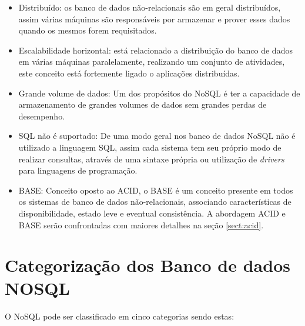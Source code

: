 \documentclass[12pt]{article}
\begin{document}
\begin{itemize}
	\item Distribuído: os banco de dados não-relacionais são em geral distribuídos, assim várias máquinas são responsáveis por armazenar e prover esses dados quando os mesmos forem requisitados.\\
	\item Escalabilidade horizontal: está relacionado a distribuição do banco de dados em várias máquinas paralelamente, realizando um conjunto de atividades, este conceito está fortemente ligado o aplicações distribuídas. \\
	\item Grande volume de dados: Um dos propósitos do NoSQL é ter a capacidade de armazenamento de grandes volumes de dados sem grandes perdas de desempenho.\\
	\item SQL não é suportado: De uma modo geral nos banco de dados NoSQL não é utilizado a linguagem SQL, assim cada sistema tem seu próprio modo de realizar consultas, através de uma sintaxe própria ou utilização de \textit{drivers} para linguagens de programação.\\
	\item BASE: Conceito oposto ao ACID, o BASE é um conceito presente em todos os sistemas de banco de dados não-relacionais, associando características de disponibilidade, estado leve e eventual consistência. A abordagem ACID e BASE serão confrontadas com maiores detalhes na seção \ref{sect:acid}.
\end{itemize}

\section{Categorização dos Banco de dados NOSQL}
\label{sec:categorizacao}


O NoSQL pode ser classificado em cinco categorias \cite{typeNOSQL:2013} sendo estas: 
\end{document}
